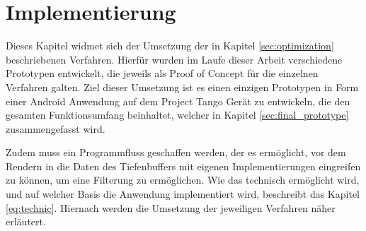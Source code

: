\chapter{Implementierung} \label{sec:implementation}

Dieses Kapitel widmet sich der Umsetzung der in Kapitel \ref{sec:optimization} beschriebenen Verfahren. Hierfür wurden im Laufe dieser Arbeit verschiedene Prototypen entwickelt, die jeweils als Proof of Concept für die einzelnen Verfahren galten. Ziel dieser Umsetzung ist es einen einzigen Prototypen in Form einer Android Anwendung auf dem Project Tango Gerät zu entwickeln, die den gesamten Funktionsumfang beinhaltet, welcher in Kapitel \ref{sec:final_prototype} zusammengefasst wird. 

Zudem muss ein Programmfluss geschaffen werden, der es ermöglicht, vor dem Rendern in die Daten des Tiefenbuffers mit eigenen Implementierungen eingreifen zu können, um eine Filterung zu ermöglichen. Wie das technisch ermöglicht wird, und auf welcher Basis die Anwendung implementiert wird, beschreibt das Kapitel \ref{eq:technic}. Hiernach werden die Umsetzung der jeweiligen Verfahren näher erläutert.










